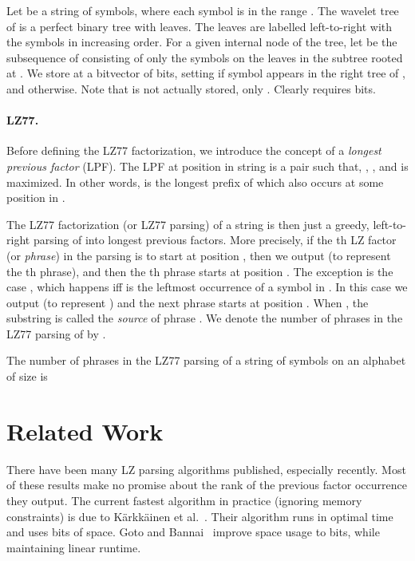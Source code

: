 \documentclass[11pt,runningheads]{llncs}
\begin{document}
{Let  be a string of  symbols, where each symbol is in
the range .  The wavelet tree  of  is a
perfect binary tree with  leaves. The leaves are labelled
left-to-right with the symbols  in increasing
order. For a given internal node  of the tree, let  be the
subsequence of  consisting of only the symbols on the leaves in the
subtree rooted at . We store at  a bitvector  of 
bits, setting  if symbol  appears in the right
tree of , and  otherwise. Note that  is not
actually stored, only . Clearly  requires 
bits.

\paragraph{LZ77.}
Before defining the LZ77 factorization, we introduce the concept of a
{\em longest previous factor} (LPF).  The LPF at position  in
string  is a pair  such that, ,
, and  is maximized.
In other words,  is the longest
prefix of  which also occurs at some position  in
.

The LZ77 factorization (or LZ77 parsing) of a string  is then just
a greedy, left-to-right parsing of  into longest previous
factors. More precisely, if the th LZ factor (or {\em phrase}) in
the parsing is to start at position , then we output 
(to represent the th phrase), and then the th phrase starts
at position . The exception is the case , which
happens iff  is the leftmost occurrence of a symbol in . In
this case we output  (to represent ) and the next
phrase starts at position .  When , the substring
 is called the {\em source} of phrase
. We denote the number of phrases in the LZ77 parsing
of  by .

\begin{theorem}
The number of phrases  in the LZ77 parsing of a string of  symbols
on an alphabet of size  is 
\end{theorem}

\section{Related Work}
\label{sec-related}

There have been many LZ parsing algorithms published, especially recently. 
Most of these results make no promise about the rank of the previous factor occurrence they 
output.
The current fastest algorithm in practice (ignoring memory constraints) is due to 
K{\"a}rkk{\"a}inen et al.~\cite{kkp2013}. Their algorithm runs in optimal  time and uses  
bits of space. Goto and Bannai~\cite{gb2014} improve space usage to  
bits, while maintaining linear runtime.

}
\end{document}

